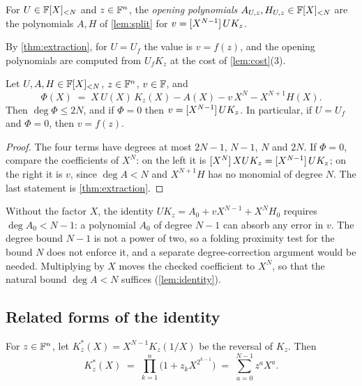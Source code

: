 \begin{definition}\label{def:opening-polys}
For $U \in \mathbb{F}[X]_{<N}$ and $z \in \mathbb{F}^n$, the \emph{opening polynomials} $A_{U,z}, H_{U,z} \in \mathbb{F}[X]_{<N}$ are the polynomials $A, H$ of \cref{lem:split} for $v = [X^{N-1}]\,U K_z$.
\end{definition}

By \cref{thm:extraction}, for $U = U_f$ the value is $v = f(z)$, and the opening polynomials are computed from $U_f K_z$ at the cost of \cref{lem:cost}(3).

\begin{lemma}\label{lem:identity}
Let $U, A, H \in \mathbb{F}[X]_{<N}$, $z \in \mathbb{F}^n$, $v \in \mathbb{F}$, and
\[
  \Phi(X) \;=\; X\,U(X)\,K_z(X) - A(X) - v\,X^N - X^{N+1} H(X).
\]
Then $\deg \Phi \le 2N$, and if $\Phi = 0$ then $v = [X^{N-1}]\,U K_z$. In particular, if $U = U_f$ and $\Phi = 0$, then $v = f(z)$.
\end{lemma}

\begin{proof}
The four terms have degrees at most $2N-1$, $N-1$, $N$ and $2N$. If $\Phi = 0$, compare the coefficients of $X^N$: on the left it is $[X^{N}]\,XUK_z = [X^{N-1}]\,UK_z$; on the right it is $v$, since $\deg A < N$ and $X^{N+1}H$ has no monomial of degree $N$. The last statement is \cref{thm:extraction}.
\end{proof}

\begin{remark}\label{rem:why-x}
Without the factor $X$, the identity $U K_z = A_0 + vX^{N-1} + X^N H_0$ requires $\deg A_0 < N-1$: a polynomial $A_0$ of degree $N-1$ can absorb any error in $v$. The degree bound $N-1$ is not a power of two, so a folding proximity test for the bound $N$ does not enforce it, and a separate degree-correction argument would be needed. Multiplying by $X$ moves the checked coefficient to $X^N$, so that the natural bound $\deg A < N$ suffices (\cref{lem:identity}).
\end{remark}

\subsection{Related forms of the identity}\label{sec:kernel:related}

\begin{lemma}[Reversal]\label{lem:reversal}
For $z \in \mathbb{F}^n$, let $K^\ast_z(X) = X^{N-1} K_z(1/X)$ be the reversal of $K_z$. Then
\[
  K^\ast_z(X) \;=\; \prod_{k=1}^{n} \bigl(1 + z_k X^{2^{k-1}}\bigr) \;=\; \sum_{a=0}^{N-1} z^a X^a .
\]
\end{lemma}

